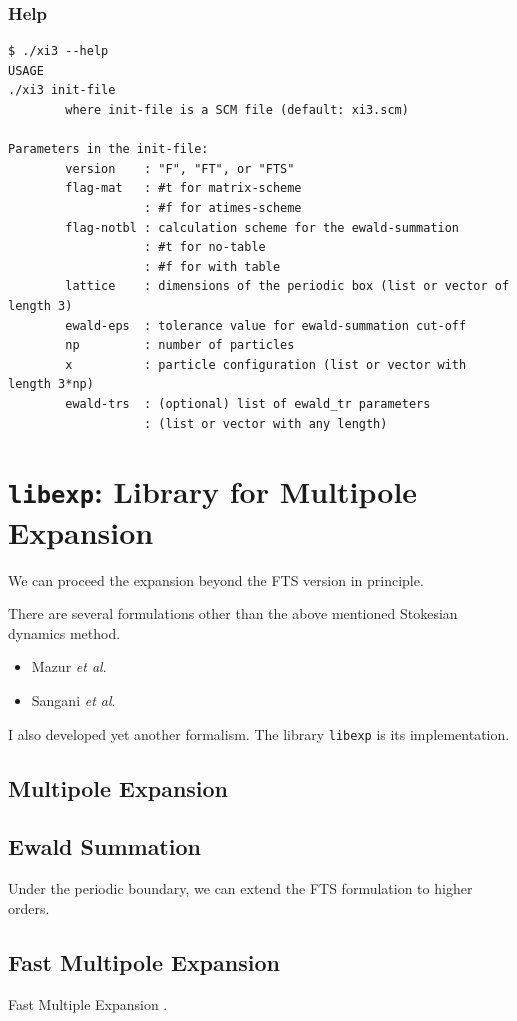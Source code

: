 \documentclass{book}
\begin{document}
\subsection{Help}
{\small
\begin{verbatim}
$ ./xi3 --help
USAGE
./xi3 init-file
        where init-file is a SCM file (default: xi3.scm)

Parameters in the init-file:
        version    : "F", "FT", or "FTS"
        flag-mat   : #t for matrix-scheme
                   : #f for atimes-scheme
        flag-notbl : calculation scheme for the ewald-summation
                   : #t for no-table
                   : #f for with table
        lattice    : dimensions of the periodic box (list or vector of length 3)
        ewald-eps  : tolerance value for ewald-summation cut-off
        np         : number of particles
        x          : particle configuration (list or vector with length 3*np)
        ewald-trs  : (optional) list of ewald_tr parameters
                   : (list or vector with any length)
\end{verbatim}
}


\chapter{{\tt libexp}:
  Library for Multipole Expansion}
\label{chp:libexp}
We can proceed the expansion beyond the FTS version in principle.

There are several formulations other than the above mentioned
Stokesian dynamics method.
\begin{itemize}
\item Mazur {\it et al}.
\item Sangani {\it et al}.
\end{itemize}
I also developed yet another formalism.\cite{ichiki2002}
The library {\tt libexp} is its implementation.


\section{Multipole Expansion}


\section{Ewald Summation}
Under the periodic boundary,
we can extend the FTS formulation to higher orders.



\section{Fast Multipole Expansion}
Fast Multiple Expansion
\cite{greengard,greengard1987}.
\end{document}
